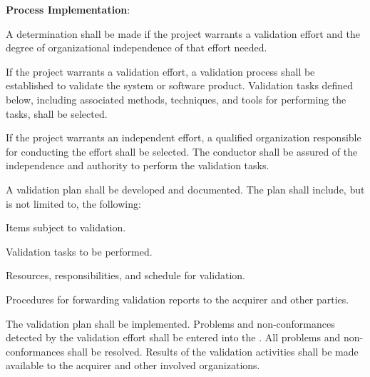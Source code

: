 			\begin{adjustwidth}{2em}{0pt} 

				\begin{compactenum}

					\item {\bf Process Implementation}:

					\begin{compactenum}

						\item A determination shall be made if the project warrants a validation effort and the degree of organizational independence of that effort needed.

						\item If the project warrants a validation effort, a validation process shall be established to validate the system or software product. Validation tasks defined below, including associated methods, techniques, and tools for performing the tasks, shall be selected.

						\item If the project warrants an independent effort, a qualified organization responsible for conducting the effort shall be selected. The conductor shall be assured of the independence and authority to perform the validation tasks.

						\item A validation plan shall be developed and documented. The plan shall include, but is not limited to, the following:

						\begin{compactenum}

							\item Items subject to validation.

							\item Validation tasks to be performed.

							\item Resources, responsibilities, and schedule for validation.

							\item Procedures for forwarding validation reports to the acquirer and other parties.

						\end{compactenum}

						\item The validation plan shall be implemented. Problems and non-conformances detected by the validation effort shall be entered into the . All problems and non-conformances shall be resolved. Results of the validation activities shall be made available to the acquirer and other involved organizations.


\end{compactenum}
\end{compactenum}
\end{adjustwidth}
